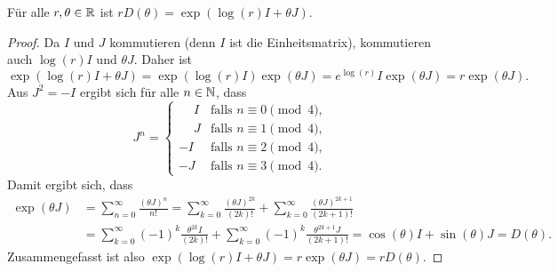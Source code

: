 \documentclass[a4paper, 10pt, numbers=noenddot]{scrartcl}
\begin{document}
\begin{lemma}\label{lem: finding a logarithm for rotation matrices}
  Für alle $r, \theta \in \mathbb{R}$ ist $r D(\theta) = \exp(\log(r) I + \theta J)$.
\end{lemma}
\begin{proof}
  Da $I$ und $J$ kommutieren (denn $I$ ist die Einheitsmatrix), kommutieren auch $\log(r) I$ und $\theta J$.
  Daher ist
  \[
      \exp(\log(r) I + \theta J)
    = \exp(\log(r) I) \exp(\theta J)
    = e^{\log(r)} I \exp(\theta J)
    = r \exp(\theta J).
  \]
  Aus $J^2 = -I$ ergibt sich für alle $n \in \mathbb{N}$, dass
  \[
    J^n
    =
    \begin{cases}
      \phantom{-}I  & \text{falls $n \equiv 0 \pmod 4$},  \\
      \phantom{-}J  & \text{falls $n \equiv 1 \pmod 4$},  \\
                -I  & \text{falls $n \equiv 2 \pmod 4$},  \\
                -J  & \text{falls $n \equiv 3 \pmod 4$}.
    \end{cases}
  \]
  Damit ergibt sich, dass
  \begin{align*}
        \exp(\theta J)
    &=  \sum_{n=0}^\infty \frac{(\theta J)^n}{n!}
     =    \sum_{k=0}^\infty \frac{(\theta J)^{2k}}{(2k)!}
        + \sum_{k=0}^\infty \frac{(\theta J)^{2k+1}}{(2k+1)!}     \\
    &=    \sum_{k=0}^\infty (-1)^k \frac{\theta^{2k} I}{(2k)!}
        + \sum_{k=0}^\infty (-1)^k \frac{\theta^{2k+1} J}{(2k+1)!}
     =  \cos(\theta) I + \sin(\theta) J
     =  D(\theta).
  \end{align*}
  Zusammengefasst ist also $\exp(\log(r)I + \theta J) = r \exp(\theta J) = r D(\theta)$.
\end{proof}
\end{document}
